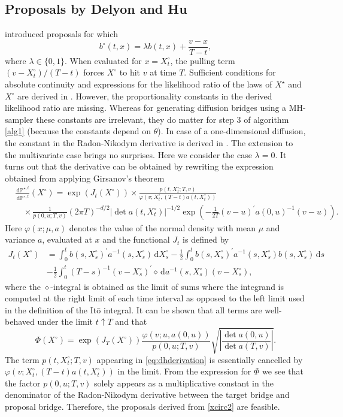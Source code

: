 \documentclass[preprint]{imsart}
\renewcommand{\th}{\theta}
\newcommand{\la}{\lambda}
\newcommand{\bb}[1]{\mathbb{#1}}
\theoremstyle{definition}
\newcommand{\dd}{{\,\mathrm d}}
\newcommand{\T}{{\prime}}
\begin{document}
\subsection{Proposals by Delyon and Hu}\label{sec:DHprop}
\cite{DelyonHu} introduced proposals for which 
\begin{equation}\label{xcirc2} 
b^\circ(t,x) =  \la b(t, x) + \frac{v-x}{T-t}, \end{equation}
where $\la \in \{0,1\}$. When evaluated for $x=X^\circ_t$, the pulling term $(v-X^\circ_t)/(T-t)$  forces $X^\circ$ to hit $v$ at time $T$.  Sufficient conditions for absolute continuity  and  expressions for the likelihood ratio of the laws of $X^\star$ and $X^\circ$ are derived in \cite{DelyonHu}. However,  the proportionality constants in the derived likelihood ratio are missing. Whereas for generating diffusion bridges using a MH-sampler these constants are irrelevant, they do matter for step 3 of algorithm \ref{alg1} (because the constants depend on $\th$). In case of a one-dimensional diffusion, the constant in the Radon-Nikodym derivative is derived in \cite{PapaspiliopoulosRoberts}. The extension to the multivariate case brings no surprises. Here we consider the case $\la=0$.  It turns out that  the  derivative can be obtained by rewriting the expression obtained from applying Girsanov's theorem
\begin{align}\label{eq:dhderivation}  &\frac{\dd \bb{P}^{\star,t}}{\dd \bb{P}^{\circ,t}}(X^\circ) = 
\exp\left(J_t(X^\circ)\right) \times \frac{p(t, X^\circ_t; T,v)}{\varphi(v; X^\circ_t, (T-t) a(t,X^\circ_t))} \\ &\quad \times   \frac1{p(0,u; T,v)} (2\pi T)^{-d/2} |\det a(t,X^\circ_t)|^{-1/2} \exp\left(-\frac1{2 T}   (v-u)^\T a(0,u)^{-1}(v-u)\right).\nonumber
\end{align}
  Here $\varphi(x; \mu,a)$ denotes the value of the normal density with mean $\mu$ and variance $a$, evaluated at $x$ and the functional $J_t$ is defined by 
\begin{align*} J_t(X^\circ)&= \int_0^t b(s,X^\circ_s)^\T a^{-1}(s,X^\circ_s) \dd X^\circ_s- \frac12 \int_0^t b(s,X^\circ_s)^\T  a^{-1}(s,X^\circ_s) b(s,X^\circ_s)\dd s  \\ & -\frac12 \int_0^t (T-s)^{-1}(v-X^\circ_s)^\T  \diamond \dd a^{-1}(s,X^\circ_s) (v-X^\circ_s),  \end{align*}
where  the $\diamond$-integral is obtained as the limit of sums where the integrand is computed at the right limit of each time interval as opposed to the left limit used in the definition of the It\=o integral. It can be shown that all terms are well-behaved under the limit $t\uparrow T$ and that 
\[ \Phi(X^\circ)= \exp\left(J_T(X^\circ)\right) \frac{\varphi(v; u, a(0,u))}{p(0,u; T,v)} \sqrt{\left|\frac{\det a(0,u)}{\det a(T,v)}\right|}. \] The term $p(t, X^\circ_t; T,v)$ appearing in \eqref{eq:dhderivation}  is essentially cancelled by $\varphi(v; X^\circ_t, (T-t) a(t,X^\circ_t))$ in the limit.
From the expression for $\Phi$  we see that the factor $p(0,u; T,v)$ solely appears as a multiplicative constant in the denominator of the Radon-Nikodym derivative between the target bridge and proposal bridge. Therefore, the proposals derived from \eqref{xcirc2} are feasible. 
\end{document}
